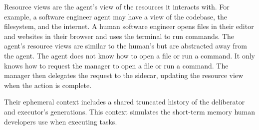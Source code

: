 \documentclass[a4paper,twocolumn,11pt]{quantumarticle}
\begin{document}
Resource views are the agent's view of the resources it interacts with. For example, a software engineer agent may have a view of the codebase, the filesystem, and the internet. A human software engineer opens files in their editor and websites in their browser and uses the terminal to run commands. The agent's resource views are similar to the human's but are abstracted away from the agent. The agent does not know how to open a file or run a command. It only knows how to request the manager to open a file or run a command. The manager then delegates the request to the sidecar, updating the resource view when the action is complete.

Their ephemeral context includes a shared truncated history of the deliberator and executor's generations. This context simulates the short-term memory human developers use when executing tasks.
\end{document}
